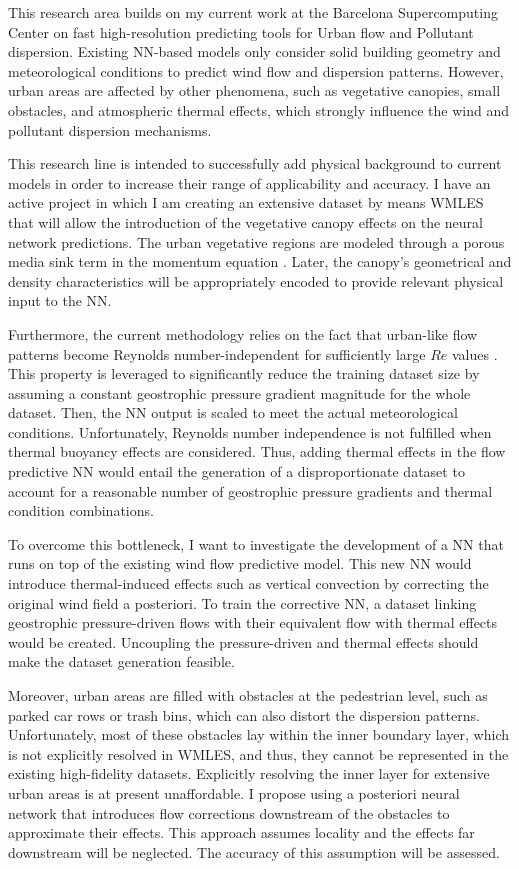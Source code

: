 \documentclass{article}
\begin{document}
This research area builds on my current work at the Barcelona Supercomputing Center on fast high-resolution predicting tools for Urban flow and Pollutant dispersion. Existing NN-based models only consider solid building geometry and meteorological conditions to predict wind flow and dispersion patterns. However, urban areas are affected by other phenomena, such as vegetative canopies, small obstacles, and atmospheric thermal effects, which strongly influence the wind and pollutant dispersion mechanisms. 

This research line is intended to successfully add physical background to current models in order to increase their range of applicability and accuracy. I have an active project in which I am creating an extensive dataset by means WMLES that will allow the introduction of the vegetative canopy effects on the neural network predictions. The urban vegetative regions are modeled through a porous media sink term in the momentum equation \cite{VIA21}. Later, the canopy's geometrical and density characteristics will be appropriately encoded to provide relevant physical input to the NN.

Furthermore, the current methodology relies on the fact that urban-like flow patterns become Reynolds number-independent for sufficiently large $Re$ values \cite{LIM09}. This property is leveraged to significantly reduce the training dataset size by assuming a constant geostrophic pressure gradient magnitude for the whole dataset. Then, the NN output is scaled to meet the actual meteorological conditions. Unfortunately, Reynolds number independence is not fulfilled when thermal buoyancy effects are considered. Thus, adding thermal effects in the flow predictive NN would entail the generation of a disproportionate dataset to account for a reasonable number of geostrophic pressure gradients and thermal condition combinations. 

To overcome this bottleneck, I want to investigate the development of a NN that runs on top of the existing wind flow predictive model. This new NN would introduce thermal-induced effects such as vertical convection by correcting the original wind field a posteriori. To train the corrective NN, a dataset linking geostrophic pressure-driven flows with their equivalent flow with thermal effects would be created. Uncoupling the pressure-driven and thermal effects should make the dataset generation feasible.

Moreover, urban areas are filled with obstacles at the pedestrian level, such as parked car rows or trash bins, which can also distort the dispersion patterns. Unfortunately, most of these obstacles lay within the inner boundary layer, which is not explicitly resolved in WMLES, and thus, they cannot be represented in the existing high-fidelity datasets. Explicitly resolving the inner layer for extensive urban areas is at present unaffordable. I propose using a posteriori neural network that introduces flow corrections downstream of the obstacles to approximate their effects. This approach assumes locality and the effects far downstream will be neglected. The accuracy of this assumption will be assessed. 
\end{document}
